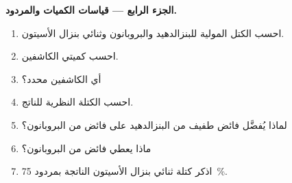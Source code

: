 \begin{problem}
\medskip
\noindent\textbf{الجزء الرابع --- قياسات الكميات والمردود.}
\begin{enumerate}[resume]
  \item احسب الكتل المولية للبنزالدهيد والبروبانون وثنائي بنزال الأسيتون.
  \item احسب كميتي الكاشفين.
  \item أي الكاشفين محدد؟
  \item احسب الكتلة النظرية للناتج.
  \item لماذا يُفضَّل فائض طفيف من البنزالدهيد على فائض من البروبانون؟
  \item ماذا يعطي فائض من البروبانون؟
  \item اذكر كتلة ثنائي بنزال الأسيتون الناتجة بمردود 75~\%.
\end{enumerate}
\end{problem}
